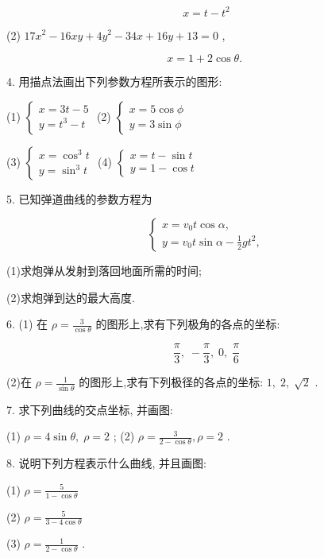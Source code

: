 \documentclass[lang=cn,newtx,12pt,scheme=chinese]{elegantbook}
\begin{document}
\[
  x = t - {t}^{2}
\]

(2) \({17}{x}^{2} - {16xy} + 4{y}^{2} - {34x} + {16y} + {13} = 0\) ,

\[
  x = 1 + 2\cos \theta \text{. }
\]

4. 用描点法画出下列参数方程所表示的图形:

(1) \(\left\{ \begin{array}{l} x = {3t} - 5 \\ y = {t}^{3} - t \end{array}\right.\) (2) \(\left\{ \begin{array}{l} x = 5\cos \phi \\ y = 3\sin \phi \end{array}\right.\)

(3) \(\left\{ \begin{array}{l} x = {\cos }^{3}t \\ y = {\sin }^{3}t \end{array}\right.\) (4) \(\left\{ \begin{array}{l} x = t - \sin t \\ y = 1 - \cos t \end{array}\right.\)

5. 已知弹道曲线的参数方程为

\[
  \left\{ \begin{array}{l} x = {v}_{0}t\cos \alpha , \\ y = {v}_{0}t\sin \alpha - \frac{1}{2}g{t}^{2}, \end{array}\right.
\]

(1)求炮弹从发射到落回地面所需的时间;

(2)求炮弹到达的最大高度.

6. (1) 在 \(\rho = \frac{3}{\cos \theta }\) 的图形上,求有下列极角的各点的坐标:

\[
  \frac{\pi }{3},\; - \frac{\pi }{3},\;0,\;\frac{\pi }{6}
\]

(2)在 \(\rho = \frac{1}{\sin \theta }\) 的图形上,求有下列极径的各点的坐标: \(1,\;2,\;\sqrt{2}\) .

7. 求下列曲线的交点坐标, 并画图:

(1) \(\rho = 4\sin \theta ,\;\rho = 2\) ; (2) \(\rho = \frac{3}{2 - \cos \theta },\rho = 2\) .

8. 说明下列方程表示什么曲线, 并且画图:

(1) \(\rho = \frac{5}{1 - \cos \theta }\)

(2) \(\rho = \frac{5}{3 - 4\cos \theta }\)

(3) \(\rho = \frac{1}{2 - \cos \theta }\) .
\end{document}
